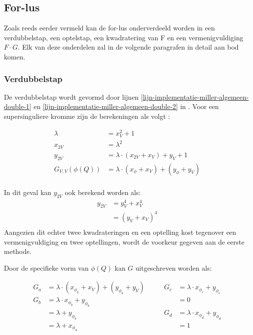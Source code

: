\subsection{For-lus\label{subsectie-implementatie-miller-forlus}}

Zoals reeds eerder vermeld kan de for-lus onderverdeeld worden in een verdubbelstap, een optelstap, een kwadratering van F en een vermenigvuldiging $F \cdot G$. Elk van deze onderdelen zal in de volgende paragrafen in detail aan bod komen.

\subsubsection{Verdubbelstap}

De verdubbelstap wordt gevormd door lijnen \ref{lijn-implementatie-miller-algemeen-double-1} en \ref{lijn-implementatie-miller-algemeen-double-2} in . Voor een supersinguliere kromme zijn de berekeningen als volgt \cite{bertoni, hankerson-book}:

\[\begin{aligned}
	\lambda &= x_V^2 + 1\\
	x_{2V} &= \lambda ^2\\
	y_{2V} &= \lambda \cdot (x_{2V} + x_V) + y_V + 1\\
	G_{V,V}(\phi(Q)) &= \lambda \cdot (x_{\phi} + x_V) + (y_{\phi} + y_V)\\
\end{aligned}\]

In dit geval kan $y_{2V}$ ook berekend worden als:
\[\begin{aligned}
y_{2V}	&= y_V^4 + x_V^4\\
			&= (y_V + x_V)^4\\
\end{aligned}\]
Aangezien dit echter twee kwadrateringen en een optelling kost tegenover een vermenigvuldiging en twee optellingen, wordt de voorkeur gegeven aan de eerste methode.

Door de specifieke vorm van $\phi(Q)$ kan $G$ uitgeschreven worden als:

\[\begin{aligned}
	G_a	&=	\lambda \cdot (x_{\phi_a} + x_V) + (y_{\phi_a} + y_V)\qquad&
				G_c	&= \lambda \cdot x_{\phi_c} + y_{\phi_c}\\
	G_b	&=	\lambda \cdot x_{\phi_b} + y_{\phi_b}&
						&= 0\\
			&= \lambda + y_{\phi_b}&
				G_d	&= \lambda \cdot x_{\phi_d} + y_{\phi_d}\\
			&=	\lambda + x_{\phi_a}&
						&= 1\\
\end{aligned}\]

